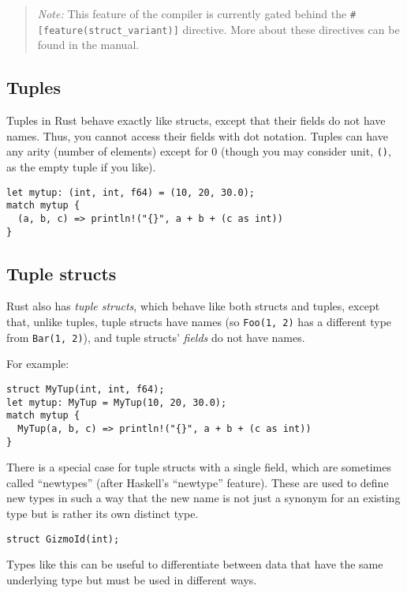 \documentclass[]{article}
\begin{document}
\begin{quote}
\emph{Note:} This feature of the compiler is currently gated behind the
\texttt{\#{[}feature(struct\_variant){]}} directive. More about these
directives can be found in the manual.
\end{quote}

\subsection{Tuples}\label{tuples}

Tuples in Rust behave exactly like structs, except that their fields do
not have names. Thus, you cannot access their fields with dot notation.
Tuples can have any arity (number of elements) except for 0 (though you
may consider unit, \texttt{()}, as the empty tuple if you like).

\begin{verbatim}
let mytup: (int, int, f64) = (10, 20, 30.0);
match mytup {
  (a, b, c) => println!("{}", a + b + (c as int))
}
\end{verbatim}

\subsection{Tuple structs}\label{tuple-structs}

Rust also has \emph{tuple structs}, which behave like both structs and
tuples, except that, unlike tuples, tuple structs have names (so
\texttt{Foo(1, 2)} has a different type from \texttt{Bar(1, 2)}), and
tuple structs' \emph{fields} do not have names.

For example:

\begin{verbatim}
struct MyTup(int, int, f64);
let mytup: MyTup = MyTup(10, 20, 30.0);
match mytup {
  MyTup(a, b, c) => println!("{}", a + b + (c as int))
}
\end{verbatim}

There is a special case for tuple structs with a single field, which are
sometimes called ``newtypes'' (after Haskell's ``newtype'' feature).
These are used to define new types in such a way that the new name is
not just a synonym for an existing type but is rather its own distinct
type.

\begin{verbatim}
struct GizmoId(int);
\end{verbatim}

Types like this can be useful to differentiate between data that have
the same underlying type but must be used in different ways.
\end{document}
